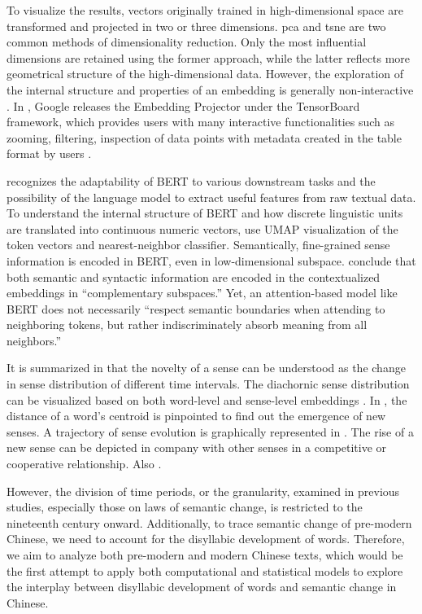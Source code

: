 To visualize the results, vectors originally trained in high-dimensional space are transformed and projected in two or three dimensions. \gls{pca} and \gls{tsne} \parencite{vandermaaten2008tsne} are two common methods of dimensionality reduction. Only the most influential dimensions are retained using the former approach, while the latter reflects more geometrical structure of the high-dimensional data. However, the exploration of the internal structure and properties of an embedding is generally non-interactive \parencite{smilkov2016projector}. In \cite*{smilkov2016projector}, Google releases the Embedding Projector under the TensorBoard framework, which provides users with many interactive functionalities such as zooming, filtering, inspection of data points with metadata created in the table format by users \parencite{smilkov2016projector}.

\textcite{coenen2019visualizing} recognizes the adaptability of BERT to various downstream tasks and the possibility of the language model to extract useful features from raw textual data. To understand the internal structure of BERT and how discrete linguistic units are translated into continuous numeric vectors, \textcite{coenen2019visualizing} use UMAP visualization of the token vectors and nearest-neighbor classifier. Semantically, fine-grained sense information is encoded in BERT, even in low-dimensional subspace. \textcite{coenen2019visualizing} conclude that both semantic and syntactic information are encoded in the contextualized embeddings in ``complementary subspaces.'' Yet, an attention-based model like BERT does not necessarily ``respect semantic boundaries when attending to neighboring tokens, but rather indiscriminately absorb meaning from all neighbors.'' \parencite{coenen2019visualizing}

It is summarized in \textcite{tang2018state} that the novelty of a sense can be understood as the change in sense distribution of different time intervals. The diachornic sense distribution can be visualized based on both word-level and sense-level embeddings \parencite{dubossarsky2015bottom,hu2019diachronic}. In \textcite{dubossarsky2015bottom}, the distance of a word's centroid is pinpointed to find out the emergence of new senses. A trajectory of sense evolution is graphically represented in \textcite{hu2019diachronic}. The rise of a new sense can be depicted in company with other senses in a competitive or cooperative relationship. Also \parencite{gonen2020simple}.

However, the division of time periods, or the granularity, examined in previous studies, especially those on laws of semantic change, is restricted to the nineteenth century onward. Additionally, to trace semantic change of pre-modern Chinese, we need to account for the disyllabic development of words. Therefore, we aim to analyze both pre-modern and modern Chinese texts, which would be the first attempt to apply both computational and statistical
models to explore the interplay between disyllabic development of words and semantic change in Chinese.



